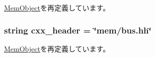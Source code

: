 \hyperlink{classMemObject_1_1MemObject_a17fa61ac3806b481cafee5593b55e5d0}{MemObject}を再定義しています。\hypertarget{classBus_1_1BaseBus_a17da7064bc5c518791f0c891eff05fda}{
\subsubsection[{cxx\_\-header}]{\setlength{\rightskip}{0pt plus 5cm}string {\bf cxx\_\-header} = \char`\"{}mem/bus.hh\char`\"{}}}
\label{classBus_1_1BaseBus_a17da7064bc5c518791f0c891eff05fda}


\hyperlink{classMemObject_1_1MemObject_a17da7064bc5c518791f0c891eff05fda}{MemObject}を再定義しています。

